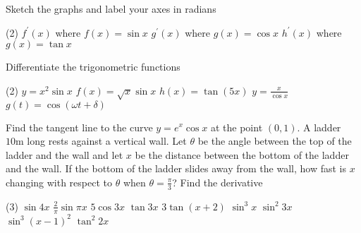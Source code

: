 \begin{Exercise}[title={Standard Derivatives},label=exStandardDerivatives]
\Question Sketch the graphs and label your axes in radians
	\begin{tasks}(2)
	\task $f^{ \prime } (x)$ where $f (x) =\sin  x$ %
	\task $g^{ \prime } (x)$ where $g (x) =\cos  x$  %
	\task $h^{ \prime } (x)$ where $g (x)  =\tan x$  %
\end{tasks}

\Question Differentiate the trigonometric functions
\begin{tasks}(2)
	\task $y =x^{2} \sin  x$ %
	\task $f (x) =\sqrt{x} \sin  x$ %
	\task $h (x) =\tan  (5 x)$ %
	\task $y =\frac{x}{\cos  x}$ %
	\task $g (t) =\cos  (\omega  t +\delta )$ %
\end{tasks}

\Question Find the tangent line to the curve $y =e^{x} \cos  x$ at the point $(0 ,1)$. %
\Question A ladder $10 \mbox{m}$ long rests against a vertical wall. Let $\theta $ be the angle between the top of the ladder and the wall and let $x$ be the distance between the bottom of the ladder and the wall. If the bottom of the ladder slides away from the wall, how fast is $x$ changing with respect to $\theta $ when $\theta  =\frac{\pi }{3}$? %
	\clearpage
	\Question Find the derivative
\begin{tasks}(3)
	\task  $\sin  4 x$ %
	\task $\frac{2}{\pi } \sin  \pi  x$ %
	\task $5 \cos  3 x$ %
	\task $\tan  3 x$ 	%
	\task $3 \tan  \left (x +2\right )$  %
	\task $\sin ^{3} x$ %
	\task $\sin ^{2} 3 x$ %
	\task $\sin ^{3} \left (x -1\right )^{2}$ %
	\task $\tan ^{2} 2 x$ %
	
\end{tasks}

\end{Exercise}
